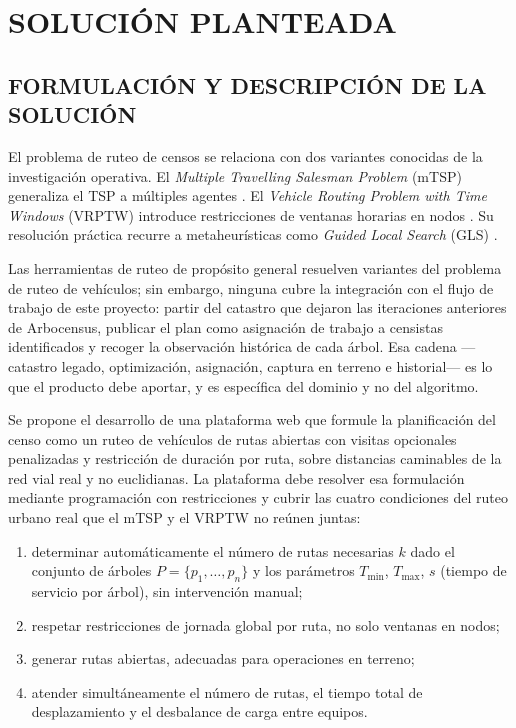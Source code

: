 \chapter{SOLUCIÓN PLANTEADA}
\label{cap:solucion}

\section{FORMULACIÓN Y DESCRIPCIÓN DE LA SOLUCIÓN}
\label{sec:solucion}

El problema de ruteo de censos se relaciona con dos variantes conocidas de la investigación
operativa. El \textit{Multiple Travelling Salesman Problem} (mTSP) generaliza el TSP a múltiples
agentes \citep{bektas2006multiple}. El \textit{Vehicle Routing Problem with Time Windows} (VRPTW)
introduce restricciones de ventanas horarias en nodos \citep{solomon1987algorithms,
toth2014vehicle}. Su resolución práctica recurre a metaheurísticas como \textit{Guided Local Search} (GLS)
\citep{voudouris1999guided}.

Las herramientas de ruteo de propósito general resuelven variantes del problema de ruteo de
vehículos; sin embargo, ninguna cubre la integración con el flujo de trabajo de este proyecto:
partir del catastro que dejaron
las iteraciones anteriores de Arbocensus, publicar el plan como asignación de trabajo a censistas
identificados y recoger la observación histórica de cada árbol. Esa
cadena ---catastro legado, optimización, asignación, captura en terreno e historial--- es lo que el
producto debe aportar, y es específica del dominio y no del algoritmo.

Se propone el desarrollo de una plataforma web que formule la planificación del censo como un
ruteo de vehículos de rutas abiertas con visitas opcionales penalizadas y restricción de
duración por ruta, sobre distancias caminables de la red vial real y no euclidianas. La plataforma
debe resolver esa formulación mediante programación con restricciones y cubrir las cuatro
condiciones del ruteo urbano real que el mTSP y el VRPTW no reúnen juntas:
\begin{enumerate}
  \item determinar automáticamente el número de rutas necesarias $k$ dado el conjunto de árboles $P =
        \{p_1, \ldots, p_n\}$ y los parámetros $T_{\min}$, $T_{\max}$, $s$ (tiempo de servicio por
        árbol), sin intervención manual;
  \item respetar restricciones de jornada global por ruta, no solo ventanas en nodos;
  \item generar rutas abiertas, adecuadas para operaciones en terreno;
  \item atender simultáneamente el número de rutas, el tiempo total de desplazamiento y el
        desbalance de carga entre equipos.
\end{enumerate}

